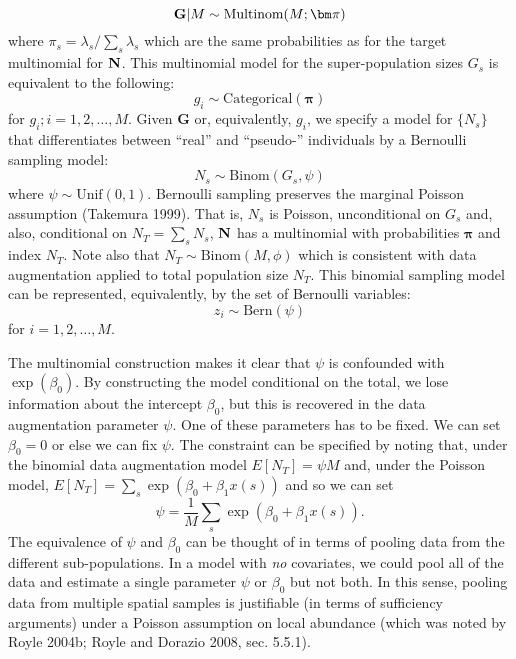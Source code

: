 \begin{equation}
{\bf G}|M \sim \mbox{Multinom}(M;  {\bm \pi} ) 
\label{eq.mn1}
\end{equation}
where $\pi_{s} = \lambda_{s}/\sum_{s} \lambda_{s}$ which are the same
probabilities as for the target multinomial for ${\bf N}$. 
This multinomial model for the super-population sizes $G_{s}$ is
equivalent to the following:
\[
 g_{i} \sim \mbox{Categorical}({\bm \pi} )
\]
for $g_{i}; i=1,2,\ldots, M$.
Given {\bf G} or, equivalently, $g_{i}$, we specify a model for $\{ N_{s}\}$ that differentiates
between ``real'' and ``pseudo-'' individuals by a Bernoulli sampling
model:
\[
 N_{s} \sim \mbox{Binom}(G_{s} , \psi)
\]
where $\psi \sim \mbox{Unif}(0,1)$. Bernoulli sampling preserves the
marginal Poisson assumption (Takemura 1999). That is, $N_{s}$ is
Poisson, unconditional on $G_{s}$ and, also, 
conditional on $N_{T} = \sum_{s} N_{s}$,
${\bf N}$ has a multinomial with probabilities ${\bm \pi}$ and
index $N_{T}$.  Note also that $N_{T} \sim \mbox{Binom}(M, \phi)$
which is consistent with  data augmentation applied to total
population size $N_{T}$. This binomial sampling model can be
represented, equivalently, by the set of Bernoulli variables:
\[
 z_{i} \sim \mbox{Bern}(\psi)
\]
for $i=1,2,\ldots,M$.



The multinomial construction makes it clear that $\psi$ is confounded
with $\exp(\beta_{0})$. By constructing the model
conditional on the total, we lose information about the intercept
$\beta_{0}$, but this is recovered in the data augmentation parameter
$\psi$.  One of these parameters has to be fixed. We can set $\beta_0
= 0$ or else we can fix $\psi$.  The constraint can be specified by
noting that, under the binomial data augmentation model
$E[N_{T}] = \psi M$ and,
under the Poisson model, $E[N_{T}] = \sum_{s} \exp(\beta_{0} + \beta_{1}
x(s))$ and so we can set
\[
 \psi = \frac{1}{M} \sum_{s} \exp(\beta_{0} + \beta_{1} x(s)).
\]
The equivalence of $\psi$ and $\beta_{0}$ can be thought of in terms of pooling data
from the different sub-populations. In a model with {\it no} covariates, 
we could pool 
all of the data and estimate a single parameter $\psi$ or $\beta_0$ but not
both. In this sense, 
 pooling data from multiple spatial samples is justifiable (in terms of
sufficiency arguments) under a Poisson assumption on local abundance
(which was noted by Royle 2004b; Royle and Dorazio 2008, sec. 5.5.1).






